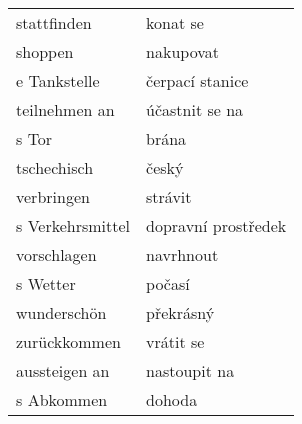 \documentclass{article}
\begin{document}
\begin{tabular}{ p{5cm}|p{5cm}  }
    stattfinden & konat se\\
    shoppen & nakupovat\\
    e Tankstelle & čerpací stanice\\
    teilnehmen an & účastnit se na\\
    s Tor & brána\\
    tschechisch & český\\
    verbringen & strávit\\
    s Verkehrsmittel & dopravní prostředek\\
    vorschlagen & navrhnout\\
    s Wetter & počasí\\
    wunderschön & překrásný\\
    zurückkommen & vrátit se\\
    aussteigen an & nastoupit na \\
    s Abkommen & dohoda\\
\end{tabular}
\end{document}
